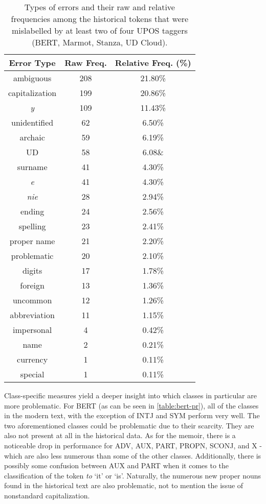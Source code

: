 \renewcommand{\arraystretch}{1.25}
\begin{table}[H]
\begin{center}
\begin{tabular}{|c|cc|}
\hline \bf Error Type & \bf Raw Freq. & \bf Relative Freq. (\%) \\ \hline
ambiguous & 208 & 21.80\% \\
capitalization & 199 & 20.86\% \\
\textit{y} & 109 & 11.43\%  \\
unidentified & 62 & 6.50\% \\
archaic & 59 & 6.19\% \\
UD & 58 & 6.08\& \\
surname & 41 & 4.30\% \\
\textit{e} & 41 & 4.30\% \\
\textit{nie} & 28 & 2.94\% \\
ending & 24 & 2.56\% \\
spelling & 23 & 2.41\% \\
proper name & 21 & 2.20\% \\
problematic & 20 & 2.10\% \\
digits & 17 & 1.78\% \\
foreign & 13 & 1.36\% \\
uncommon & 12 & 1.26\% \\
abbreviation & 11 & 1.15\% \\
impersonal & 4 & 0.42\% \\
name & 2 & 0.21\% \\
currency & 1 & 0.11\% \\
special & 1 & 0.11\% \\
\hline
\end{tabular}
\caption{\label{table:pos-errors} Types of errors and their raw and relative frequencies among the historical tokens that were mislabelled by at least two of four UPOS taggers (BERT, Marmot, Stanza, UD Cloud).}
\end{center}
\end{table}

Class-specific measures yield a deeper insight into which classes in particular are more problematic. For BERT (as can be seen in \autoref{table:bert-pr}), all of the classes in the modern text, with the exception of INTJ and SYM perform very well. The two aforementioned classes could be problematic due to their scarcity. They are also not present at all in the historical data. As for the memoir, there is a noticeable drop in performance for ADV, AUX, PART, PROPN, SCONJ, and X - which are also less numerous than some of the other classes. Additionally, there is possibly some confusion between AUX and PART when it comes to the classification of the token \textit{to} `it' or `is'. Naturally, the numerous new proper nouns found in the historical text are also problematic, not to mention the issue of nonstandard capitalization. 

